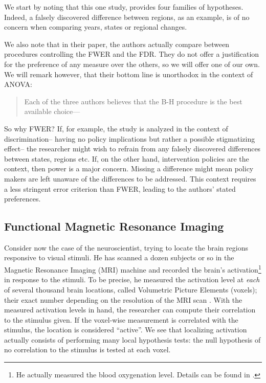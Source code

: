 \documentclass[review,12pt]{article}
\theoremstyle{definition}
\begin{document}
We start by noting that this one study, provides four families of hypotheses. Indeed, a falsely discovered difference between regions, as an example, is of no concern when comparing years, states or regional changes.

We also note that in their paper, the authors actually compare between procedures controlling the FWER and the FDR. They do not offer a justification for the preference of any measure over the others, so we will offer one of our own. We will remark however, that their bottom line is unorthodox in the context of ANOVA: 
\begin{quote}
Each of the three authors believes that the B-H procedure is the best available choice--- \citeauthor*{williams_controlling_1999}
\end{quote}

So why FWER? If, for example, the study is analyzed in the context of discrimination-- having no policy implications but rather a possible stigmatizing effect-- the researcher might wish to refrain from any falsely discovered differences between states, regions etc. If, on the other hand, intervention policies are the context, then power is a major concern. Missing a difference might mean policy makers are left unaware of the differences to be addressed. This context requires a less stringent error criterion than FWER, leading to the authors' stated preferences.





\subsection{\label{sub:fMRI}Functional Magnetic Resonance Imaging}

Consider now the case of the neuroscientist, trying to locate the brain regions responsive to visual stimuli. He has scanned a dozen subjects or so in the Magnetic Resonance Imaging (MRI) machine and recorded the brain's activation\footnote{ He actually measured the blood oxygenation level. Details can be found in \cite{lazar_statistical_2008}.} in response to the stimuli. To be precise, he measured the activation level at \emph{each} of several thousand brain locations, called Volumetric Picture Elements (voxels); their exact number depending on the resolution of the MRI scan . With the measured activation levels in hand, the researcher can compute their correlation to the stimulus given. If the voxel-wise measurement is correlated with the stimulus, the location is considered ``active''. We see that localizing activation actually consists of performing many local hypothesis tests: the null hypothesis of no correlation to the stimulus is tested at each voxel.
\end{document}
